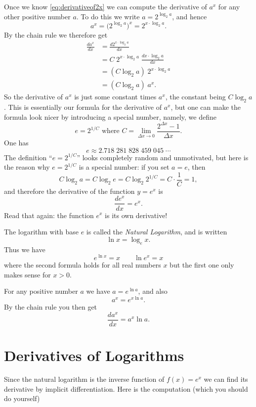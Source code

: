 Once we know \eqref{eq:derivativeof2x} we can compute the derivative of $a^x$
for any other positive number $a$. To do this we write $a=2^{\log_2 a}$,
and hence
\[
a^x = \bigl( 2^{\log_2 a} \bigr)^x = 2^{x\cdot \log_2 a}.
\]
By the chain rule we therefore get
\begin{align*}
  \frac{da^x}{dx} &= \frac{d2^{x\cdot \log_2 a}}{dx} \\
  &= C\;2^{x\cdot \log_2 a}\; \frac{dx\cdot \log_2 a}{dx}\\
  &=(C\log_2 a) \;2^{x\cdot \log_2 a} \\
  &= (C\log_2 a) \;a^x.
\end{align*}
So the derivative of $a^x$ is just some constant times $a^x$, the constant being
$C\log_2a$.  This is essentially our formula for the derivative of $a^x$, but
one can make the formula look nicer by introducing a special number, namely, we
define
\[
e=2^{1/C}\text{ where  }
C=\lim_{ \Delta x\to0} \frac{2^{ \Delta x} - 1}{ \Delta x}.
\]
One has
\[
e\approx 2.718\;281\;828\;459\;045\;\cdots 
\]
The definition ``$e = 2^{1/C}$'' looks completely random and
unmotivated, but here is the reason why $e=2^{1/C}$ is a special
number: if you set $a=e$, then
\[
C\log_2 a = C\log_2 e = C\log_2 2^{1/C} = C\cdot \frac1C =1,
\]
and therefore the derivative of the function $y=e^x$ is
\begin{equation}
  \label{eq:derivative-of-ex}
  \frac{de^x}{dx} = e^x. 
\end{equation}
Read that again: the function $e^x$ is its own derivative!

The logarithm with base $e$ is called the \emph{Natural Logarithm},
and is written
\[
\ln x = \log_e x.
\]
Thus we have 
\begin{equation}
  e^{\ln x}  = x \qquad  \ln e^x = x 
\end{equation}
where the second formula holds for all real numbers $x$ but the first one
only makes sense for $x>0$.

For any positive number $a$ we have $a=e^{\ln a}$, and also
\[
a^x = e^{x\ln a}.
\]
By the chain rule you then get
\begin{equation}
  \label{eq:derivative-of-ax}
  \dfrac{da^x}{dx} = a^x\ln a.
\end{equation}

\section{Derivatives of Logarithms}
Since the natural logarithm is the inverse function of $f(x) = e^x$ we can find
its derivative by implicit differentiation.  Here is the computation (which you
should do yourself)

